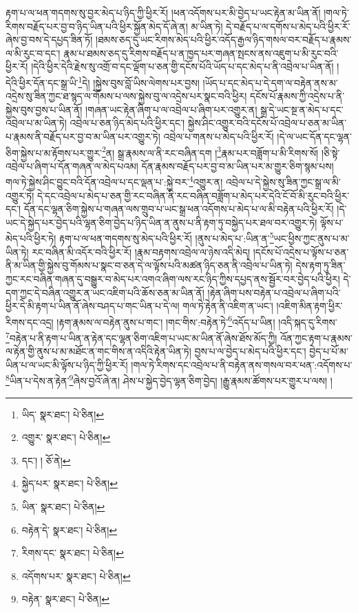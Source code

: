 རྟག་པ་ལ་ཕན་གདགས་སུ་བྱར་མེད་པ་ཉིད་ཀྱི་ཕྱིར་རོ། །ཕན་འདོགས་པར་མི་བྱེད་པ་ཡང་རྟེན་མ་ཡིན་ནོ། །གལ་ཏེ་རིགས་བརྗོད་པར་བྱ་བ་ཉིད་ཡིན་པའི་ཕྱིར་སྐྱོན་མེད་དོ་ཞེ་ན། མ་ཡིན་ཏེ། དེ་བརྗོད་པ་ལ་དགོས་པ་མེད་པའི་ཕྱིར་རོ་ཞེས་བྱ་བས་དེ་དཔྱད་ཟིན་ཏོ། །ཐམས་ཅད་དུ་ཡང་རིགས་མེད་པའི་ཕྱིར་འདོད་རྒྱལ་ཉིད་གསལ་བར་བརྗོད་པ་རྣམས་ལ་མི་རུང་བ་དང་། རྣམ་པ་ཐམས་ཅད་དུ་རིགས་བརྗོད་པ་ན་ཁྱད་པར་གཞན་སྤངས་ནས་འཇུག་པ་མི་རུང་བའི་ཕྱིར་རོ། །དེའི་ཕྱིར་དེའི་རྗེས་སུ་འགྲོ་བ་དང་ལྡོག་པ་ཅན་གྱི་དངོས་པོའི་ཡོད་པ་དང་མེད་པ་ནི་འབྲེལ་པ་ཡིན་ནོ། །དེའི་ཕྱིར་དོན་དང་སྒྲ་ཡི་\footnote{ཡིད་  སྣར་ཐང་།  པེ་ཅིན། }དེ། །སྐྱེས་བུས་བློ་ཡིས་ལེགས་པར་བྱས། །ཡོད་པ་དང་མེད་པ་དེ་དག་ལ་བརྟེན་ནས་མ་འདྲེས་སུ་ཟིན་ཀྱང་ཐ་སྙད་ལ་གོམས་པ་ལས་སྐྱེས་བུ་ལ་འདྲེས་པར་སྣང་བའི་ཕྱིར། དངོས་པོ་རྣམས་ཀྱི་འདྲེས་པ་ནི་སྐྱེས་བུས་བྱས་པ་ཡིན་ནོ། །གཞན་ཡང་རྟེན་ཞིག་པ་ལ་འབྲེལ་པ་ཞིག་པར་འགྱུར་ན། སྒྲ་དེ་ཡང་སྔ་ན་མེད་པ་དང་འབྲེལ་པ་མ་ཡིན་ཏེ། འབྲེལ་པ་ཅན་ཉིད་མེད་པའི་ཕྱིར་དང་། སྐྱེས་ཤིང་འགྱུར་བའི་དངོས་པོ་འབྲེལ་པ་ཅན་མ་ཡིན་པ་རྣམས་ནི་བརྗོད་པར་བྱ་བ་མ་ཡིན་པར་འགྱུར་ཏེ། འབྲེལ་པ་གནས་པ་མེད་པའི་ཕྱིར་རོ། །དེ་ལ་ཡང་དོན་དང་ལྷན་ཅིག་སྐྱེས་པ་མ་རྟོགས་པར་གྱུར་\footnote{འགྱུར་  སྣར་ཐང་།  པེ་ཅིན། }ན། སྒྲ་རྣམས་ལ་ནི་རང་བཞིན་དག །\footnote{དང་། །  ཅོ་ནེ། }རྣམ་པར་བཟློག་པ་མི་རིགས་སོ། །ཅི་སྟེ་འབྲེལ་པ་ཞིག་པ་དོན་གཞན་ལ་མེད་པའམ། དོན་རྣམས་བརྗོད་པར་བྱ་བ་མ་ཡིན་པར་མ་གྱུར་ཅིག་སྙམ་པས། གལ་ཏེ་སྐྱེས་ཤིང་བྱུང་བའི་དོན་འབྲེལ་པ་དང་ལྡན་པ་:སྐྱེ་བར་\footnote{སྐྱེད་པར་  སྣར་ཐང་།  པེ་ཅིན། }འགྱུར་ན། འབྲེལ་པ་དེ་སྐྱེས་སུ་ཟིན་ཀྱང་སྒྲ་ལ་མི་འགྱུར་ཏེ། དེ་དང་འབྲེལ་པ་མེད་པ་ཅན་གྱི་རང་བཞིན་ནི་རང་བཞིན་བཟློག་པ་མེད་པར་དེའི་ངོ་བོ་མི་རུང་བའི་ཕྱིར་དང་། དོན་དང་ལྷན་ཅིག་སྐྱེས་པ་གཞན་ལས་གྲུབ་པ་ཡང་སྒྲ་ཕན་འདོགས་པ་མེད་པ་ལ་མི་བརྟེན་པའི་ཕྱིར་རོ། །དེ་ཡང་དེ་སྐྱེད་པར་བྱེད་པའི་ལྷན་ཅིག་བྱེད་པ་ཉིད་ཡིན་ན་ནུས་པ་ནི་རྟག་ཏུ་བསྐྱེད་པར་ཐལ་བར་འགྱུར་ཏེ། ལྟོས་པ་མེད་པའི་ཕྱིར་ཏེ། རྟག་པ་ལ་ཕན་གདགས་སུ་མེད་པའི་ཕྱིར་རོ། །ནུས་པ་མེད་པ་:ཡིན་ན་\footnote{ཡིན་  སྣར་ཐང་།  པེ་ཅིན། }ཡང་ཕྱིས་ཀྱང་ནུས་པ་མ་ཡིན་ཏེ། རང་བཞིན་མི་འདོར་བའི་ཕྱིར་རོ། །རྣམ་བརྟགས་འབྲེལ་ལ་ཉེས་འདི་མེད། །དངོས་པོ་འདྲེས་པ་ལྟོས་པ་ཅན་ནི་མ་ཡིན་གྱི་སྐྱེས་བུ་གོམས་པ་སྣང་བ་ཅན་དེ་ལ་ལྟོས་པའི་མཚན་ཉིད་ཅན་ནི་འབྲེལ་པ་ཡིན་ཏེ། དེས་རྟག་ཏུ་ཟིན་ཀྱང་རང་བཞིན་གཞན་དུ་བསྒྱུར་བ་མེད་པར་འགའ་ཞིག་ལས་རང་ཉིད་ཀྱིས་དཔྱད་ནས་སྦྱོར་བར་བྱེད་པའི་ཕྱིར། དེ་དག་ཀྱང་དེ་བཞིན་འགྱུར་ན་ཡང་འཇིག་པའི་ཆོས་ཅན་མ་ཡིན་ནོ། །རྟེན་ཞིག་པས་བརྟེན་པ་འབྲེལ་པ་ཞིག་པའི་ཕྱིར་དེ་མི་རྟག་པ་ཡིན་ནོ་ཞེས་བཤད་པ་གང་ཡིན་པ་དེ་ལ། གལ་ཏེ་རྟེན་ནི་འཇིག་ན་ཡང་། །འཇིག་མིན་རྟག་ཕྱིར་རིགས་དང་འདྲ། །རྟག་རྣམས་ལ་བརྟེན་ནུས་པ་གང་། །གང་གིས་:བརྟེན་ཏེ་\footnote{བརྟེན་དེ་  སྣར་ཐང་།  པེ་ཅིན། }འདོད་པ་ཡིན། །འདི་སྐད་དུ་རིགས་\footnote{རིགས་དང་  སྣར་ཐང་།  པེ་ཅིན། }བརྟེན་པ་ནི་རྟག་པ་ཡིན་ན་རྟེན་དང་ལྷན་ཅིག་འཇིག་པ་ཡང་མ་ཡིན་ནོ་ཞེས་ཐོས་མོད་ཀྱི། འོན་ཀྱང་རྟག་པ་རྣམས་ལ་རྟེན་གྱི་ནུས་པ་མ་མཐོང་ན་གང་གིས་ན་འདིའི་རྟེན་ཡིན་ཏེ། བྱས་པ་ལ་བྱེད་པ་མེད་པའི་ཕྱིར་དང་། བྱེད་པ་པོ་མ་ཡིན་པ་ལ་ཡང་མི་ལྟོས་པ་ཉིད་ཀྱི་ཕྱིར་རོ། །གལ་ཏེ་རིགས་དང་འབྲེལ་པ་ནི་བརྟེན་ནས་གསལ་བར་ཕན་:འདོགས་པ་\footnote{འདོགས་པར་  སྣར་ཐང་།  པེ་ཅིན། }ཡིན་པ་དེས་ན་རྟེན་\footnote{བརྟེན་  སྣར་ཐང་།  པེ་ཅིན། }ཞེས་བྱའོ་ཞེ་ན། ཤེས་པ་སྐྱེད་བྱེད་ལྷན་ཅིག་བྱེད། །རྒྱུ་རྣམས་ཚོགས་པར་གྱུར་པ་ལས། །
